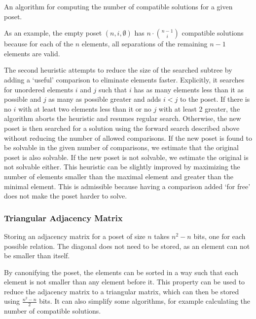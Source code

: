 \documentclass[10pt,journal,compsoc]{IEEEtran}
\begin{document}
\begin{algorithm}[t]
  \centering
  
  \caption{An algorithm for computing the number of compatible solutions for a given poset.}
  \label{algo:compatible_solutions}
\end{algorithm}

As an example, the empty poset $(n,i,\emptyset)$ has $n \cdot \binom{n - 1}{i}$ compatible solutions because
for each of the $n$ elements, all separations of the remaining $n - 1$ elements
are valid.


The second heuristic attempts to reduce the size of the searched subtree by adding a `useful' comparison to eliminate elements faster.
Explicitly, it searches for unordered elements $i$ and $j$ such that $i$ has as many elements less than it as possible and $j$ as many as possible greater and adds $i < j$ to the poset.
If there is no $i$ with at least two elements less than it or no $j$ with at least 2 greater, the algorithm aborts the heuristic and resumes regular search.
Otherwise, the new poset is then searched for a solution using the forward search described above without reducing the number of allowed comparisons.
If the new poset is found to be solvable in the given number of comparisons, we estimate that the original poset is also solvable.
If the new poset is not solvable, we estimate the original is not solvable either.
This heuristic can be slightly improved by maximizing the number of elements smaller than the maximal element and greater than the minimal element.
This is admissible because having a comparison added `for free' does not make the poset harder to solve.

\subsubsection{Triangular Adjacency Matrix}
Storing an adjacency matrix for a poset of size $n$ takes $n^2 - n$ bits, one for each possible relation.
The diagonal does not need to be stored, as an element can not be smaller than itself.

By canonifying the poset, the elements can be sorted in a way such that each element is not smaller than any element before it.
This property can be used to reduce the adjacency matrix to a triangular matrix, which can then be stored using $\frac{n^2 - n}{2}$ bits.
It can also simplify some algorithms, for example calculating the number of compatible solutions.
\end{document}
